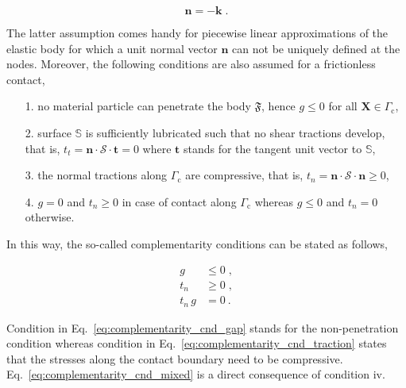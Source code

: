 \documentclass[10pt,a4paper]{article}
\begin{document}
\begin{equation}
	\mathbf{n} = - \mathbf{k} \;. \label{eq:outward_normals}
\end{equation}

The latter assumption comes handy for piecewise linear approximations of the elastic body for which a unit normal vector $\mathbf{n}$ can not be uniquely defined at the nodes. Moreover, the following conditions are also assumed for a frictionless contact,

\begin{itemize}

	\item[1.] no material particle can penetrate the body $\mathfrak{F}$, hence $g \le 0$ for all $\mathbf{X} \in \Gamma_{\text{c}}$,
	
	\item[2.] surface $\mathbb{S}$ is sufficiently lubricated such that no shear tractions develop, that is, $t_t = \mathbf{n} \cdot \boldsymbol{\mathcal{S}} \cdot \mathbf{t} = 0$ where $\mathbf{t}$ stands for the tangent unit vector to $\mathbb{S}$,
	
	\item[3.] the normal tractions along $\Gamma_{\text{c}}$ are compressive, that is, $t_n = \mathbf{n} \cdot \boldsymbol{\mathcal{S}} \cdot \mathbf{n} \ge 0$,
	
	\item[4.] $g = 0$ and $t_n \ge 0$ in case of contact along $\Gamma_{\text{c}}$ whereas $g \le 0$ and $t_n = 0$ otherwise.

\end{itemize}

In this way, the so-called complementarity conditions can be stated as follows,

\begin{subequations}
	\begin{alignat}{1}
		g &\le 0 \;, \label{eq:complementarity_cnd_gap} \\
		t_n &\ge 0 \;,  \label{eq:complementarity_cnd_traction} \\
		t_n\,g &= 0 \:. \label{eq:complementarity_cnd_mixed} 
	\end{alignat}
	\label{eq:complementarity_cnds}
\end{subequations}

Condition in Eq.~\eqref{eq:complementarity_cnd_gap} stands for the non-penetration condition whereas condition in Eq.~\eqref{eq:complementarity_cnd_traction} states that the stresses along the contact boundary need to be compressive. Eq.~\eqref{eq:complementarity_cnd_mixed} is a direct consequence of condition iv.
\end{document}
